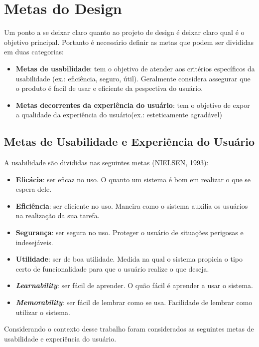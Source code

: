 \chapter[Metas do Design]{Metas do Design}

Um ponto a se deixar claro quanto ao projeto de design é deixar claro qual é o objetivo principal. Portanto é necessário definir as metas que podem ser divididas em duas categorias:
\begin{itemize}
	\item \textbf{Metas de usabilidade}: tem o objetivo de atender aos critérios específicos da usabilidade (ex.: eficiência, seguro, útil). Geralmente considera assegurar que o produto é facil de usar e eficiente da pespectiva do usuário.
	\item \textbf{Metas decorrentes da experiência do usuário}: tem o objetivo de expor a qualidade da experiência do usuário(ex.: esteticamente agradável)
\end{itemize}

\section{Metas de Usabilidade e Experiência do Usuário}

A usabilidade são divididas nas seguintes metas (NIELSEN, 1993):
\begin{itemize}
	\item \textbf{Eficácia}: ser eficaz no uso. O quanto um sistema é bom em realizar o que se espera dele.
	\item \textbf{Eficiência}: ser eficiente no uso. Maneira como o sistema auxilia os usuários na realização da sua tarefa.
	\item \textbf{Segurança}: ser segura no uso. Proteger o usuário de situações perigosas e indesejáveis.
	\item \textbf{Utilidade}: ser de boa utilidade. Medida na qual o sistema propicia o tipo certo de funcionalidade para que o usuário realize o que deseja.
	\item \textbf{\textit{Learnability}}: ser fácil de aprender. O quão fácil é aprender a usar o sistema.
	\item \textbf{\textit{Memorability}}: ser fácil de lembrar como se usa. Facilidade de lembrar como utilizar o sistema.
\end{itemize}

Considerando o contexto desse trabalho foram considerados as seguintes metas de usabilidade e experiência do usuário.

